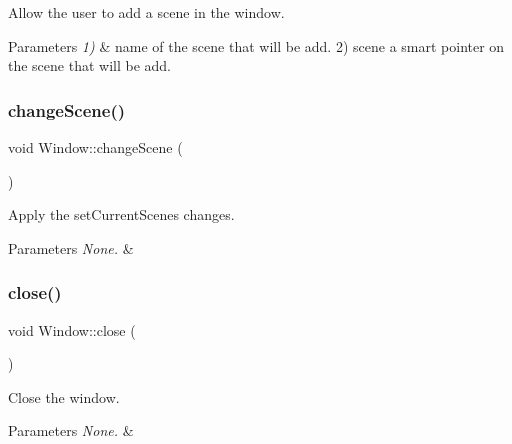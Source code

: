 Allow the user to add a scene in the window. 


\begin{DoxyParams}{Parameters}
{\em 1)} & \textquotesingle{}name\textquotesingle{} of the scene that will be add. 2) \textquotesingle{}scene\textquotesingle{} a smart pointer on the scene that will be add. \\
\hline
\end{DoxyParams}
\mbox{\label{classWindow_af1b2a635ce47d9e841445b8b866a3b28}} 
\subsubsection{\texorpdfstring{change\+Scene()}{changeScene()}}
{\footnotesize\ttfamily void Window\+::change\+Scene (\begin{DoxyParamCaption}{ }\end{DoxyParamCaption})}



Apply the set\+Current\+Scene\textquotesingle{}s changes. 


\begin{DoxyParams}{Parameters}
{\em None.} & \\
\hline
\end{DoxyParams}
\mbox{\label{classWindow_a35055c04498121d39741bfcd5082705b}} 
\subsubsection{\texorpdfstring{close()}{close()}}
{\footnotesize\ttfamily void Window\+::close (\begin{DoxyParamCaption}{ }\end{DoxyParamCaption})}



Close the window. 


\begin{DoxyParams}{Parameters}
{\em None.} & \\
\hline
\end{DoxyParams}
\mbox{\label{classWindow_ad3a1ead02eca314e2df94e3e932fb5ae}} 
